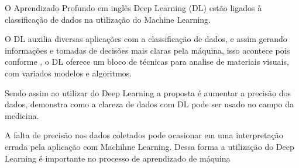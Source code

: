 O Aprendizado Profundo em inglês Deep Learning (DL) estão ligados à classificação de dados na utilização do Machine Learning.

O DL auxilia diversas aplicações com a classificação de dados, e assim gerando informações e tomadas de decisões mais claras pela máquina, isso acontece pois conforme \cite{ponti:2017}, o DL oferece um bloco de técnicas para analise de materiais visuais, com variados modelos e algoritmos.

Sendo assim ao utilizar do Deep Learning a proposta é aumentar a precisão dos dados, \cite{karatekin:2019} demonstra como a clareza de dados com DL pode ser usado no campo da medicina.

A falta de precisão nos dados coletados pode ocasionar em uma interpretação errada pela aplicação com Machihne Learning. Dessa forma a utilização do Deep Learning é importante no processo de aprendizado de máquina
